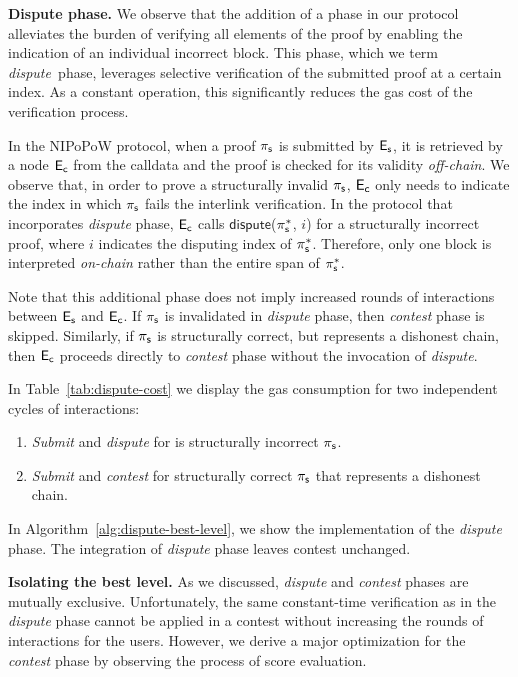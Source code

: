 

\newcommand{\dispute}{\emph{dispute\ }} \noindent \textbf{Dispute phase.} We
observe that the addition of a phase in our protocol alleviates the burden of
verifying all elements of the proof by enabling the indication of an individual
incorrect block. This phase, which we term \dispute phase, leverages selective
verification of the submitted proof at a certain index. As a constant
operation, this significantly reduces the gas cost of the verification process.

In the NIPoPoW protocol, when a proof $\mathsf{\pi_{s}}$ is submitted by $\mathsf{E_{s}}$, it is
retrieved by a node $\mathsf{E_{c}}$ from the calldata and the proof is checked for its
validity \emph{off-chain}. We observe that, in
order to prove a structurally invalid $\mathsf{\pi_{s}}$, $\mathsf{E_{c}}$ only needs to
indicate the index in which $\mathsf{\pi_{s}}$ fails the interlink verification. In the
protocol that incorporates \emph{dispute} phase, $\mathsf{E_{c}}$ calls
$\textsf{dispute}$($\mathsf{\pi_{s}^*}$, $i$) for a structurally incorrect proof, where $i$
indicates the disputing index of $\mathsf{\pi_{s}^*}$. Therefore, only one block is
interpreted \emph{on-chain} rather than the entire span of $\mathsf{\pi_{s}^*}$.

Note that this additional phase does not imply increased rounds of
interactions between $\mathsf{E_{s}}$ and $\mathsf{E_{c}}$. If $\mathsf{\pi_{s}}$ is invalidated in
\emph{dispute} phase, then \emph{contest} phase is skipped. Similarly, if
$\mathsf{\pi_{s}}$ is structurally correct, but represents a dishonest chain, then $\mathsf{E_{c}}$
proceeds directly to \emph{contest} phase without the invocation of \emph{dispute}.



In Table~\ref{tab:dispute-cost} we display the gas consumption for
two independent cycles of interactions:
\begin{enumerate}
    \item \emph{Submit} and \emph{dispute} for is structurally incorrect
        $\mathsf{\pi_{s}}$.
    \item \emph{Submit} and \emph{contest} for structurally correct
        $\mathsf{\pi_{s}}$ that represents a dishonest chain.
\end{enumerate}

\noindent In Algorithm~\ref{alg:dispute-best-level}, we show the implementation
of the \emph{dispute} phase. The integration of \emph{dispute} phase leaves
\textsf{contest} unchanged.

\noindent \textbf{Isolating the best level.} As we discussed, \emph{dispute}
and \emph{contest} phases are mutually exclusive. Unfortunately, the same
constant-time verification as in the \emph{dispute} phase cannot be applied in a
contest without increasing the rounds of interactions for the users. However,
we derive a major optimization for the \emph{contest} phase by observing the
process of score evaluation.

